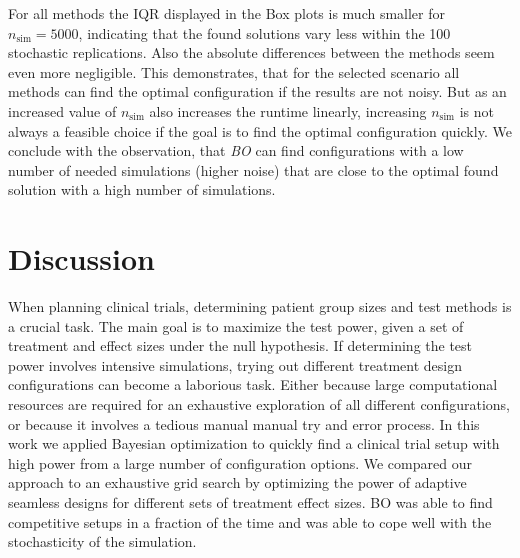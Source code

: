 \documentclass[bimj,fleqn]{w-art}
\theoremstyle{plain}
\theoremstyle{definition}
\begin{document}
For all methods the IQR displayed in the Box plots is much smaller for $n_\text{sim} = 5000$, indicating that the found solutions vary less within the 100 stochastic replications.
Also the absolute differences between the methods seem even more negligible.
This demonstrates, that for the selected scenario all methods can find the optimal configuration if the results are not noisy.
But as an increased value of $n_\text{sim}$ also increases the runtime linearly, increasing $n_\text{sim}$ is not always a feasible choice if the goal is to find the optimal configuration quickly.
We conclude with the observation, that \emph{BO} can find configurations with a low number of needed simulations (higher noise) that are close to the optimal found solution with a high number of simulations.





\section{Discussion}
\label{sec:discussion}

When planning clinical trials, determining patient group sizes and test methods is a crucial task.
The main goal is to maximize the test power, given a set of treatment and effect sizes under the null hypothesis.
If determining the test power involves intensive simulations, trying out different treatment design configurations can become a laborious task.
Either because large computational resources are required for an exhaustive exploration of all different configurations, or because it involves a tedious manual manual try and error process.
In this work we applied Bayesian optimization to quickly find a clinical trial setup with high power from a large number of configuration options.
We compared our approach to an exhaustive grid search by optimizing the power of adaptive seamless designs for different sets of treatment effect sizes.
BO was able to find competitive setups in a fraction of the time and was able to cope well with the stochasticity of the simulation.
\end{document}
